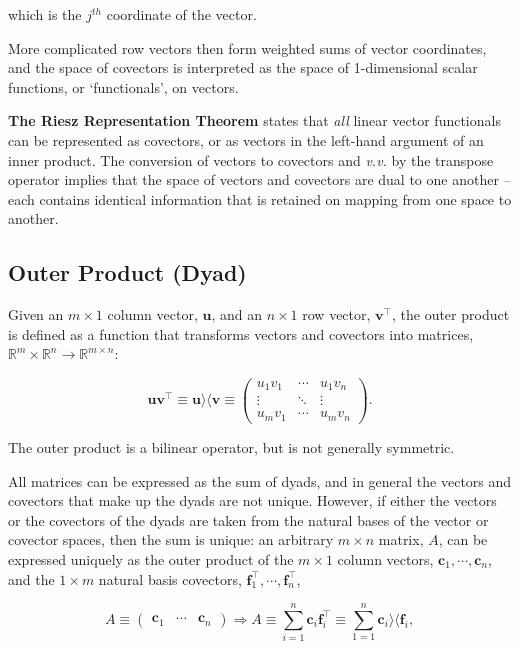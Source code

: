 \documentclass[12pt, twoside, draft]{article}
\begin{document}
which is the $j^{th}$ coordinate of the vector.

More complicated row vectors then form weighted sums of vector coordinates, and the space of covectors is interpreted as the space of 1-dimensional scalar functions, or `functionals', on vectors.  

\textbf{The Riesz Representation Theorem} states that \textit{all} linear vector functionals can be represented as covectors, or as vectors in the left-hand argument of an inner product.  The conversion of vectors to covectors and \textit{v.v.} by the transpose operator implies that the space of vectors and covectors are dual to one another -- each contains identical information that is retained on mapping from one space to another.

\subsection{Outer Product (Dyad)}\label{sec:outer-product}
Given an $m \times 1$ column vector, $\mathbf{u}$, and an $n \times 1$ row vector, $\mathbf{v}^\top$, the outer product is defined as a function that transforms vectors and covectors into matrices, $\mathbb{R}^m \times \mathbb{R}^n \rightarrow \mathbb{R}^{m \times n}$:

\begin{equation}\label{eq:outer_product}
\mathbf{u} \mathbf{v}^\top \equiv \mathbf{u} \rangle \langle \mathbf{v} \equiv \begin{pmatrix} u_1 v_1 & \cdots & u_1 v_n \\ \vdots & \ddots & \vdots \\ u_m v_1 & \cdots & u_m v_n \end{pmatrix} .
\end{equation}

The outer product is a bilinear operator, but is not generally symmetric.  

All matrices can be expressed as the sum of dyads, and in general the vectors and covectors that make up the dyads are not unique.  However, if either the vectors or the covectors of the dyads are taken from the natural bases of the vector or covector spaces, then the sum is unique: an arbitrary $m \times n$ matrix, $A$, can be expressed uniquely as the outer product of the $m \times 1$ column vectors, $\mathbf{c}_1, \cdots, \mathbf{c}_n$, and the $1 \times m$ natural basis covectors, $\mathbf{f}_1^\top, \cdots, \mathbf{f}_n^\top$,

\begin{equation}\label{eq:matrix_from_column_basis}
A  \equiv \begin{pmatrix} \mathbf{c}_1 & \cdots & \mathbf{c}_n \end{pmatrix} \Rightarrow A \equiv \sum_{i=1}^n \mathbf{c}_i \mathbf{f}_i^\top \equiv \sum_{1=1}^n \mathbf{c}_i \rangle \langle \mathbf{f}_i,
\end{equation}
\end{document}
